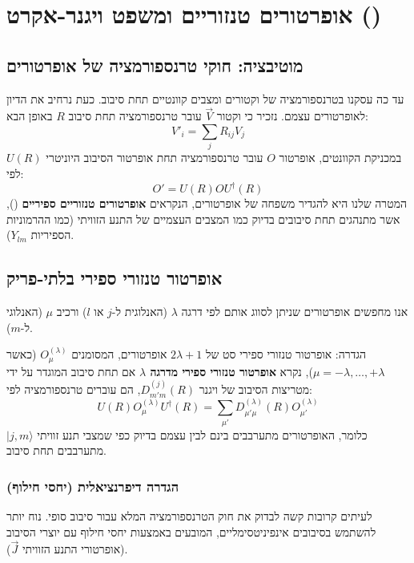 \section{אופרטורים טנזוריים ומשפט ויגנר-אקרט ()}

\subsection{מוטיבציה: חוקי טרנספורמציה של אופרטורים}
עד כה עסקנו בטרנספורמציה של וקטורים ומצבים קוונטיים תחת סיבוב. כעת נרחיב את הדיון לאופרטורים עצמם.
נזכיר כי וקטור $\vec{V}$ עובר טרנספורמציה תחת סיבוב $R$ באופן הבא:
\begin{equation}
    V'_i = \sum_j R_{ij} V_j
\end{equation}
במכניקת הקוונטים, אופרטור $O$ עובר טרנספורמציה תחת אופרטור הסיבוב היוניטרי $U(R)$ לפי:
\begin{equation}
    O' = U(R) O U^\dagger(R)
\end{equation}
המטרה שלנו היא להגדיר משפחה של אופרטורים, הנקראים \textbf{אופרטורים טנזוריים ספיריים} (), אשר מתנהגים תחת סיבובים בדיוק כמו המצבים העצמיים של התנע הזוויתי (כמו ההרמוניות הספיריות $Y_{lm}$).

\subsection{אופרטור טנזורי ספירי בלתי-פריק}
אנו מחפשים אופרטורים שניתן לסווג אותם לפי דרגה $\lambda$ (האנלוגית ל-$j$ או $l$) ורכיב $\mu$ (האנלוגי ל-$m$).

\begin{definitionbox}{הגדרה: אופרטור טנזורי ספירי}
סט של $2\lambda + 1$ אופרטורים, המסומנים $O_\mu^{(\lambda)}$ (כאשר $\mu = -\lambda, \dots, +\lambda$), נקרא \textbf{אופרטור טנזורי ספירי מדרגה $\lambda$} אם תחת סיבוב המוגדר על ידי מטריצות הסיבוב של ויגנר $D_{m'm}^{(j)}(R)$, הם עוברים טרנספורמציה לפי:
\begin{equation}
    U(R) O_\mu^{(\lambda)} U^\dagger(R) = \sum_{\mu'} D_{\mu'\mu}^{(\lambda)}(R) O_{\mu'}^{(\lambda)}
\end{equation}
כלומר, האופרטורים מתערבבים בינם לבין עצמם בדיוק כפי שמצבי תנע זוויתי $|j,m\rangle$ מתערבבים תחת סיבוב.
\end{definitionbox}

\subsubsection{הגדרה דיפרנציאלית (יחסי חילוף)}
לעיתים קרובות קשה לבדוק את חוק הטרנספורמציה המלא עבור סיבוב סופי. נוח יותר להשתמש בסיבובים אינפיניטסימליים, המובעים באמצעות יחסי חילוף עם יוצרי הסיבוב (אופרטורי התנע הזוויתי $\vec{J}$).


